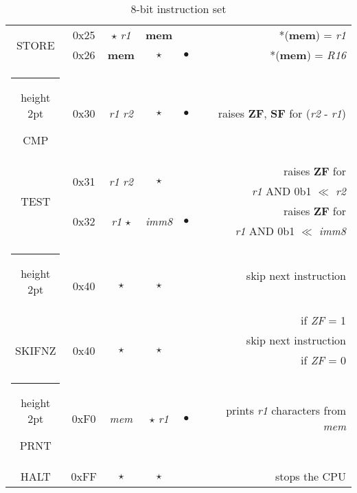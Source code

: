 \documentclass[a4paper,12pt]{article}
\makeatletter
\newcommand{\thickhline}{%
    \noalign {\ifnum 0=`}\fi \hrule height 2pt
    \futurelet \reserved@a \@xhline
}
\makeatother
\begin{document}
\begin{table}[H]
\begin{tabular}{|c|c|c|c|c|r|}
        \hline
        \multirow{2}{*}{STORE} & 0x25 & $\star$ \quad \textit{r1} & \textbf{mem} & & *(\textbf{mem}) = \textit{r1}\\
        \cline{2-6}
                             & 0x26 & \textbf{mem} & $\star$ & $\bullet$ & *(\textbf{mem}) = \textit{R16}\\
        \thickhline
        CMP & 0x30 & \textit{r1} \quad \textit{r2} & $\star$ & $\bullet$ & raises \textbf{ZF}, \textbf{SF} for (\textit{r2} - \textit{r1})\\
        \hline
        \multirow{4}{*}{TEST} & \multirow{2}{*}{0x31} & \multirow{2}{*}{\textit{r1} \quad \textit{r2}} & \multirow{2}{*}{$\star$} & & raises \textbf{ZF} for \\
         & & & & & \textit{r1} AND 0b1 $\ll$ \textit{r2}\\
        \cline{2-6}
                             & \multirow{2}{*}{0x32} & \multirow{2}{*}{\textit{r1} \quad $\star$} & \multirow{2}{*}{\textit{imm8}} & \multirow{2}{*}{$\bullet$} & raises \textbf{ZF} for \\
                             & & & & & \textit{r1} AND 0b1 $\ll$ \textit{imm8}\\
        \thickhline
        \multirow{2}{*}{SKIFZ} & \multirow{2}{*}{0x40} & \multirow{2}{*}{$\star$} & \multirow{2}{*}{$\star$} & & skip next instruction\\
         & & & & & if \textit{ZF} = 1\\
        \cline{2-6}
        \multirow{2}{*}{SKIFNZ} & \multirow{2}{*}{0x40} & \multirow{2}{*}{$\star$} & \multirow{2}{*}{$\star$} & & skip next instruction\\
         & & & & & if \textit{ZF} = 0\\
        \cline{2-6}
        \thickhline

        PRNT & 0xF0 & \textit{mem} & $\star$ \quad \textit{r1} & $\bullet$ & prints \textit{r1} characters from \textit{mem}\\
        \hline

        HALT & 0xFF & $\star$ & $\star$ & & stops the CPU\\
        \hline  
    \end{tabular}
    \caption{8-bit instruction set}
    \label{tab:8bit_instructions}
\end{table}
\end{document}
